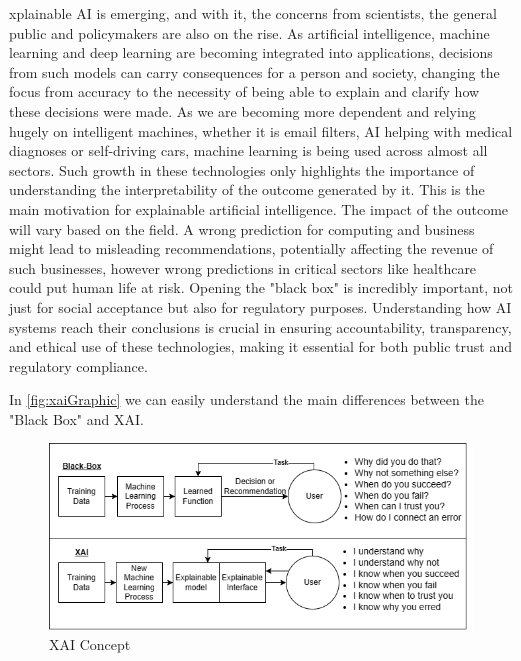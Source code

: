 \documentclass[10pt,journal,compsoc]{IEEEtran}
\begin{document}
xplainable AI is emerging, and with it, the concerns from scientists, the general public and policymakers are also on the rise. As artificial intelligence, machine learning and deep learning are becoming integrated into applications, decisions from such models can carry consequences for a person and society, changing the focus from accuracy to the necessity of being able to explain and clarify how these decisions were made.\cite{analytical-review} As we are becoming more dependent and relying hugely on intelligent machines, whether it is email filters, AI helping with medical diagnoses or self-driving cars, machine learning is being used across almost all sectors. Such growth in these technologies only highlights the importance of understanding the interpretability of the outcome generated by it. This is the main motivation for explainable artificial intelligence.\cite{doshivelez2017rigorous}
The impact of the outcome will vary based on the field. A wrong prediction for computing and business might lead to misleading recommendations, potentially affecting the revenue of such businesses, however wrong predictions in critical sectors like healthcare could put human life at risk. Opening the "black box" is incredibly important, not just for social acceptance but also for regulatory purposes. Understanding how AI systems reach their conclusions is crucial in ensuring accountability, transparency, and ethical use of these technologies, making it essential for both public trust and regulatory compliance.\cite{analytical-review}

In \autoref{fig:xaiGraphic} we can easily understand the main differences between the "Black Box" and XAI.\cite{xai-concept}

\begin{figure}[h]
    \centering
    \includegraphics[scale=0.37]{images/xaiGraphic.png}
    \caption{XAI Concept}
    \label{fig:xaiGraphic}
\end{figure}
\end{document}
